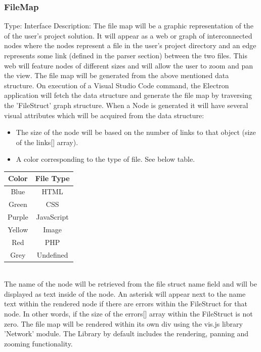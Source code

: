\documentclass[letterpaper,10pt,titlepage,draftclsnofoot,onecolumn,onesided] {IEEEtran}
\begin{document}
	\subsubsection{FileMap}
	Type: Interface
	Description: 
	The file map will be a graphic representation of the of the user's project solution. 
	It will appear as a web or graph of interconnected nodes where the nodes represent a file in the user's project directory and an edge represents some link (defined in the parser section) between the two files. 
	This web will feature nodes of different sizes and will allow the user to zoom and pan the view.
	The file map will be generated from the above mentioned data structure. 
	On execution of a Visual Studio Code command, the Electron application will fetch the data structure and generate the file map by traversing the 'FileStruct' graph structure.
	When a Node is generated it will have several visual attributes which will be acquired from the data structure:
	\begin{itemize}
	\item The size of the node will be based on the number of links to that object (size of the links[] array). 
	\item A color corresponding to the type of file. See below table.
	\end{itemize}
	\begin{tabular}{| c | c |}
	\hline
	Color & File Type\\
	\hline
	Blue & HTML\\
	Green & CSS\\
	Purple & JavaScript\\
	Yellow & Image\\
	Red & PHP\\
	Grey & Undefined\\
	\hline
	\end{tabular}
	\\
	
	The name of the node will be retrieved from the file struct name field and will be displayed as text inside of the node.
	An asterisk will appear next to the name text within the rendered node if there are errors within the FileStruct for that node. In other words, if the size of the errors[] array within the FileStruct is not zero.
	The file map will be rendered within its own div using the vis.js library 'Network' module. 
	The Library by default includes the rendering, panning and zooming functionality. \cite{visjs}
	
\end{document}
